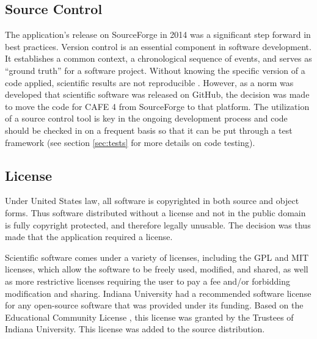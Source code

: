 \documentclass[acmtog, authorversion]{acmart}
\begin{document}
\subsection{Source Control}
The application's release on SourceForge in 2014 was a significant step forward in best practices. Version control is an essential component in software development. It establishes a common context, a chronological sequence of events, and serves as “ground truth” for a software project. Without knowing the specific version of a code applied, scientific results are not reproducible \cite{Johnson2016}. However, as a norm was developed that scientific software was released on GitHub, the decision was made to move the code for CAFE 4 from SourceForge to that platform. The utilization of a source control tool is key in the ongoing development process and code should be checked in on a frequent basis so that it can be put through a test framework (see section \ref{sec:tests} for more details on code testing).

\subsection{License}
Under United States law, all software is copyrighted in both source and object forms. Thus software distributed without a license and not in the public domain is fully copyright protected, and therefore legally unusable. The decision was thus made that the application required a license.

Scientific software comes under a variety of licenses, including the GPL and MIT licenses, which allow the software to be freely used, modified, and shared, as well as more restrictive licenses requiring the user to pay a fee and/or forbidding modification and sharing. Indiana University had a recommended software license for any open-source software that was provided under its funding. Based on the Educational Community License \cite{EduLicense}, this license was granted by the Trustees of Indiana University. This license was added to the source distribution.
\end{document}
